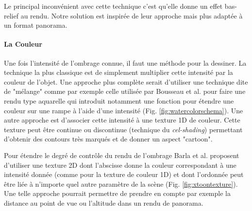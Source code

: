 Le principal inconvénient avec cette technique c'est qu'elle donne un effet bas-relief au rendu. Notre solution est inspirée de leur approche mais plus adaptée à un format panorama. 


\paragraph*{La Couleur} Une fois l'intensité de l'ombrage connue, il faut une méthode pour la dessiner. La technique la plus classique est de simplement multiplier cette intensité par la couleur de l'objet. Une approche plus complète serait d'utiliser une technique dite de "mélange" comme par exemple celle utilisée par Bousseau et al. \cite{bousseau2006interactive}  pour faire une rendu type aquarelle qui introduit notamment une fonction pour étendre une couleur sur une rampe  à l'aide d'une intensité (Fig. \ref{fig:watercolorschema}).
Une autre approche est d'associer cette intensité à une texture 1D de couleur. Cette texture peut être continue ou discontinue (technique du \textit{cel-shading}) permettant d'obtenir des contours très marqués et de donner un aspect "cartoon". 

Pour étendre le degré de contrôle du rendu de l'ombrage Barla et al. \cite{barla2006x} proposent d'utiliser une texture 2D dont l’abscisse donne la couleur correspondant à une intensité donnée (comme pour la texture de couleur 1D) et dont l'ordonnée peut être liée à n’importe quel autre paramètre de la scène (Fig. \ref{fig:xtoontexture}). Une telle approche pourrait permettre de prendre en compte par exemple la distance au point de vue ou l'altitude dans un rendu de panorama.

